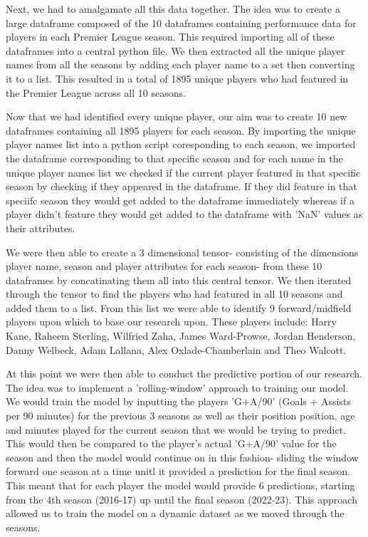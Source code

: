 \documentclass[12pt]{article}
\begin{document}
Next, we had to amalgamate all this data together. The idea was to create a 
large dataframe composed of the 10 dataframes containing performance data for players 
in each Premier League season. This required importing all of these dataframes 
into a central python file. We then extracted all the unique player names from
all the seasons by adding each player name to a set then converting it to a list.
This resulted in a total of 1895 unique players who had featured in the Premier
League across all 10 seasons.

Now that we had identified every unique player, our aim was to create 10 new 
dataframes containing all 1895 players for each season. By importing the unique
player names list into a python script coresponding to each season, we imported 
the dataframe corresponding to that specific season and for each name in the 
unique player names list we checked if the current player featured in that specific 
season by checking if they appeared in the dataframe. If they did feature in that 
speciifc season they would get added to the dataframe immediately whereas if a 
player didn't feature they would get added to the dataframe with 'NaN' values 
as their attributes. 

We were then able to create a 3 dimensional tensor- consisting of the dimensions 
player name, season and player attributes for each season- from these 10 dataframes
by concatinating them all into this central tensor. 
We then iterated through the tensor to find the players who had featured in all 
10 seasons and added them to a list. From this list we were able to identify 
9 forward/midfield players upon which to base our research upon. These players 
include:
Harry Kane, Raheem Sterling, Wilfried Zaha,
James Ward-Prowse, Jordan Henderson, Danny Welbeck,
Adam Lallana, Alex Oxlade-Chamberlain and Theo Walcott.

At this point we were then able to conduct the predictive portion of our research.
The idea was to implement a 'rolling-window' approach to training our model. 
We would train the model by inputting the players 'G+A/90' (Goals + Assists per 
90 minutes) for the previous 3 seasons as well as their position position, age 
and minutes played for the current season that we would be trying to predict.
This would then be compared to the player's actual 'G+A/90' value for the season
and then the model would continue on in this fashion- sliding the window 
forward one season at a time unitl it provided a prediction 
for the final season.
This meant that for each player the model would provide 6 predictions, starting
from the 4th season (2016-17) up until the final season (2022-23). This approach 
allowed us to train the model on a dynamic dataset as we moved through the seasons.
\end{document}
